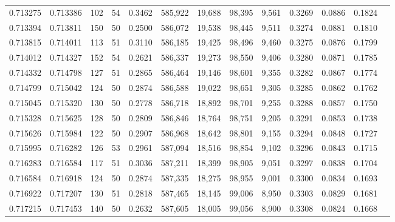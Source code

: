 \begin{tabular}{rrrrrrrrrrrrr}
0.713275 & 0.713386 &   102 &  54 &                                     0.3462 & 585,922 &  19,688 &  98,395 &   9,561 & 0.3269 & 0.0886 & 0.1824 \\
0.713394 & 0.713811 &   150 &  50 &                                     0.2500 & 586,072 &  19,538 &  98,445 &   9,511 & 0.3274 & 0.0881 & 0.1810 \\
0.713815 & 0.714011 &   113 &  51 &                                     0.3110 & 586,185 &  19,425 &  98,496 &   9,460 & 0.3275 & 0.0876 & 0.1799 \\
0.714012 & 0.714327 &   152 &  54 &                                     0.2621 & 586,337 &  19,273 &  98,550 &   9,406 & 0.3280 & 0.0871 & 0.1785 \\
0.714332 & 0.714798 &   127 &  51 &                                     0.2865 & 586,464 &  19,146 &  98,601 &   9,355 & 0.3282 & 0.0867 & 0.1774 \\
0.714799 & 0.715042 &   124 &  50 &                                     0.2874 & 586,588 &  19,022 &  98,651 &   9,305 & 0.3285 & 0.0862 & 0.1762 \\
0.715045 & 0.715320 &   130 &  50 &                                     0.2778 & 586,718 &  18,892 &  98,701 &   9,255 & 0.3288 & 0.0857 & 0.1750 \\
0.715328 & 0.715625 &   128 &  50 &                                     0.2809 & 586,846 &  18,764 &  98,751 &   9,205 & 0.3291 & 0.0853 & 0.1738 \\
0.715626 & 0.715984 &   122 &  50 &                                     0.2907 & 586,968 &  18,642 &  98,801 &   9,155 & 0.3294 & 0.0848 & 0.1727 \\
0.715995 & 0.716282 &   126 &  53 &                                     0.2961 & 587,094 &  18,516 &  98,854 &   9,102 & 0.3296 & 0.0843 & 0.1715 \\
0.716283 & 0.716584 &   117 &  51 &                                     0.3036 & 587,211 &  18,399 &  98,905 &   9,051 & 0.3297 & 0.0838 & 0.1704 \\
0.716584 & 0.716918 &   124 &  50 &                                     0.2874 & 587,335 &  18,275 &  98,955 &   9,001 & 0.3300 & 0.0834 & 0.1693 \\
0.716922 & 0.717207 &   130 &  51 &                                     0.2818 & 587,465 &  18,145 &  99,006 &   8,950 & 0.3303 & 0.0829 & 0.1681 \\
0.717215 & 0.717453 &   140 &  50 &                                     0.2632 & 587,605 &  18,005 &  99,056 &   8,900 & 0.3308 & 0.0824 & 0.1668 \\

\end{tabular}
